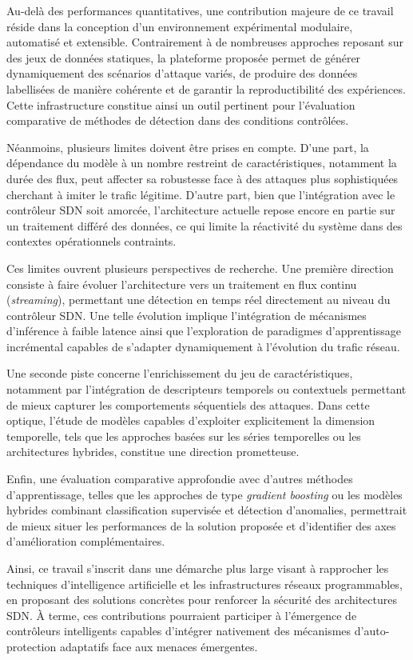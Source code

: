 \documentclass[11pt]{article}
\begin{document}
Au-delà des performances quantitatives, une contribution majeure de ce travail réside dans la conception d’un environnement expérimental modulaire, automatisé et extensible. Contrairement à de nombreuses approches reposant sur des jeux de données statiques, la plateforme proposée permet de générer dynamiquement des scénarios d’attaque variés, de produire des données labellisées de manière cohérente et de garantir la reproductibilité des expériences. Cette infrastructure constitue ainsi un outil pertinent pour l’évaluation comparative de méthodes de détection dans des conditions contrôlées.

Néanmoins, plusieurs limites doivent être prises en compte. D’une part, la dépendance du modèle à un nombre restreint de caractéristiques, notamment la durée des flux, peut affecter sa robustesse face à des attaques plus sophistiquées cherchant à imiter le trafic légitime. D’autre part, bien que l’intégration avec le contrôleur SDN soit amorcée, l’architecture actuelle repose encore en partie sur un traitement différé des données, ce qui limite la réactivité du système dans des contextes opérationnels contraints.

Ces limites ouvrent plusieurs perspectives de recherche. Une première direction consiste à faire évoluer l’architecture vers un traitement en flux continu (\textit{streaming}), permettant une détection en temps réel directement au niveau du contrôleur SDN. Une telle évolution implique l’intégration de mécanismes d’inférence à faible latence ainsi que l’exploration de paradigmes d’apprentissage incrémental capables de s’adapter dynamiquement à l’évolution du trafic réseau.

Une seconde piste concerne l’enrichissement du jeu de caractéristiques, notamment par l’intégration de descripteurs temporels ou contextuels permettant de mieux capturer les comportements séquentiels des attaques. Dans cette optique, l’étude de modèles capables d’exploiter explicitement la dimension temporelle, tels que les approches basées sur les séries temporelles ou les architectures hybrides, constitue une direction prometteuse.

Enfin, une évaluation comparative approfondie avec d’autres méthodes d’apprentissage, telles que les approches de type \textit{gradient boosting} ou les modèles hybrides combinant classification supervisée et détection d’anomalies, permettrait de mieux situer les performances de la solution proposée et d’identifier des axes d’amélioration complémentaires.

Ainsi, ce travail s’inscrit dans une démarche plus large visant à rapprocher les techniques d’intelligence artificielle et les infrastructures réseaux programmables, en proposant des solutions concrètes pour renforcer la sécurité des architectures SDN. À terme, ces contributions pourraient participer à l’émergence de contrôleurs intelligents capables d’intégrer nativement des mécanismes d’auto-protection adaptatifs face aux menaces émergentes.


\end{document}
